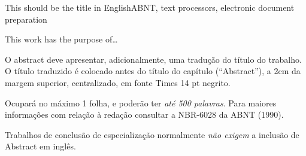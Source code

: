 \begin{englishabstract}{This should be the title in English}{ABNT, text processors, electronic document preparation}

This work has the purpose of\ldots

O abstract deve apresentar, adicionalmente, uma tradução do título do trabalho. O título traduzido é colocado antes do título do capítulo (``Abstract''), a 2cm da margem superior, centralizado, em fonte Times 14 pt negrito.

Ocupará no máximo 1 folha, e poderão ter \emph{até 500 palavras}. Para maiores informações com relação à redação consultar a NBR-6028 da ABNT (1990).

Trabalhos de conclusão de especialização normalmente \emph{não exigem} a inclusão de Abstract em inglês.
\end{englishabstract}
